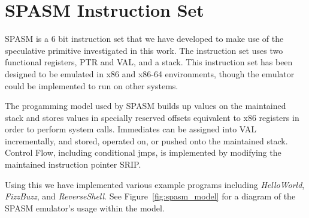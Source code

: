 \pagebreak
\section{SPASM Instruction Set}
\label{appendix:spasm}
\renewcommand{\thefootnote}{\fnsymbol{footnote}}

SPASM is a 6 bit instruction set that we have developed to make use of the 
speculative primitive investigated in this work. The instruction set uses two 
functional registers, PTR and VAL, and a stack. This instruction set has been 
designed to be emulated in x86 and x86-64 environments, though the emulator 
could be implemented to run on other systems. 

The progamming model used by SPASM builds up values on the maintained stack
and stores values in specially reserved offsets equivalent to x86 registers 
in order to perform system calls. Immediates can be assigned into VAL
incrementally, and stored, operated on, or pushed onto the maintained
stack. Control Flow, including conditional jmps, is implemented by modifying 
the maintained instruction pointer SRIP. 

Using this we have implemented various example programs including 
\textit{HelloWorld}, \textit{FizzBuzz}, and \textit{ReverseShell}.
See Figure~\ref{fig:spasm_model} for a diagram of the SPASM emulator's
usage within the \speculake model.



